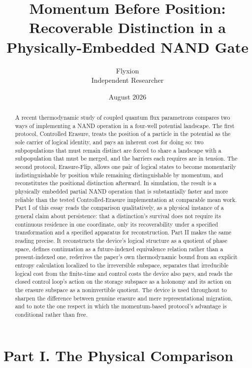 \documentclass[11pt]{article}
\title{Momentum Before Position: Recoverable Distinction in a Physically-Embedded NAND Gate}
\author{Flyxion \\ \small Independent Researcher}
\date{August 2026}
\begin{document}
\maketitle

\begin{abstract}
A recent thermodynamic study of coupled quantum flux parametrons compares two ways of implementing a NAND operation in a four-well potential landscape. The first protocol, Controlled Erasure, treats the position of a particle in the potential as the sole carrier of logical identity, and pays an inherent cost for doing so: two subpopulations that must remain distinct are forced to share a landscape with a subpopulation that must be merged, and the barriers each requires are in tension. The second protocol, Erasure-Flip, allows one pair of logical states to become momentarily indistinguishable by position while remaining distinguishable by momentum, and reconstitutes the positional distinction afterward. In simulation, the result is a physically embedded partial NAND operation that is substantially faster and more reliable than the tested Controlled-Erasure implementation at comparable mean work. Part I of this essay reads the comparison qualitatively, as a physical instance of a general claim about persistence: that a distinction's survival does not require its continuous residence in one coordinate, only its recoverability under a specified transformation and a specified apparatus for reconstruction. Part II makes the same reading precise. It reconstructs the device's logical structure as a quotient of phase space, defines continuation as a future-indexed equivalence relation rather than a present-indexed one, rederives the paper's own thermodynamic bound from an explicit entropy calculation localized to the irreversible subspace, separates that irreducible logical cost from the finite-time and control costs the device also pays, and reads the closed control loop's action on the storage subspace as a holonomy and its action on the erasure subspace as a noninvertible quotient. The device is used throughout to sharpen the difference between genuine erasure and mere representational migration, and to note the one respect in which the momentum-based protocol's advantage is conditional rather than free.
\end{abstract}

\part*{Part I. The Physical Comparison}
\end{document}
